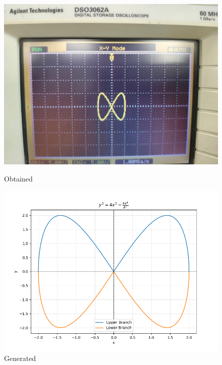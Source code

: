 \documentclass[a4paper,12pt]{article}
\numberwithin{equation}{section} %
\begin{document}
\begin{figure}[htbp]
    \centering
    \begin{minipage}{0.45\textwidth}
        \centering
        \includegraphics[width=\linewidth]{Graphs/Graph5.jpeg}
        \caption{Obtained}
    \end{minipage}
    \hfill
    \begin{minipage}{0.45\textwidth}
        \centering
        \includegraphics[width=\linewidth]{Python plots/lab1.png} 
        \caption{Generated}
    \end{minipage}
\end{figure}
\newpage
\end{document}
